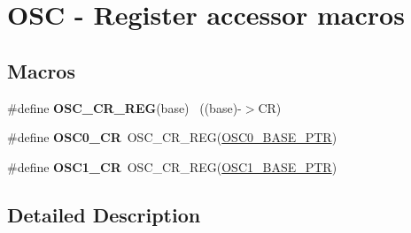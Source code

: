 \hypertarget{group___o_s_c___register___accessor___macros}{}\section{O\+S\+C -\/ Register accessor macros}
\label{group___o_s_c___register___accessor___macros}
\subsection*{Macros}
\begin{DoxyCompactItemize}
\item 
\hypertarget{group___o_s_c___register___accessor___macros_ga986cf8366f7686523f323c907f34222e}{}\#define {\bfseries O\+S\+C\+\_\+\+C\+R\+\_\+\+R\+E\+G}(base)                                              ~((base)-\/$>$C\+R)\label{group___o_s_c___register___accessor___macros_ga986cf8366f7686523f323c907f34222e}

\item 
\hypertarget{group___o_s_c___register___accessor___macros_ga55e7ae8d61b1c66e1c673163c8c0a10e}{}\#define {\bfseries O\+S\+C0\+\_\+\+C\+R}~O\+S\+C\+\_\+\+C\+R\+\_\+\+R\+E\+G(\hyperlink{group___o_s_c___peripheral_gaab1618c69a91b2e5d3385139b5b566f0}{O\+S\+C0\+\_\+\+B\+A\+S\+E\+\_\+\+P\+T\+R})\label{group___o_s_c___register___accessor___macros_ga55e7ae8d61b1c66e1c673163c8c0a10e}

\item 
\hypertarget{group___o_s_c___register___accessor___macros_ga41aaa4920497ffcf9585c4980bd01e4b}{}\#define {\bfseries O\+S\+C1\+\_\+\+C\+R}~O\+S\+C\+\_\+\+C\+R\+\_\+\+R\+E\+G(\hyperlink{group___o_s_c___peripheral_ga5a0e46e15931232a6e0cafb7315041fa}{O\+S\+C1\+\_\+\+B\+A\+S\+E\+\_\+\+P\+T\+R})\label{group___o_s_c___register___accessor___macros_ga41aaa4920497ffcf9585c4980bd01e4b}

\end{DoxyCompactItemize}


\subsection{Detailed Description}
